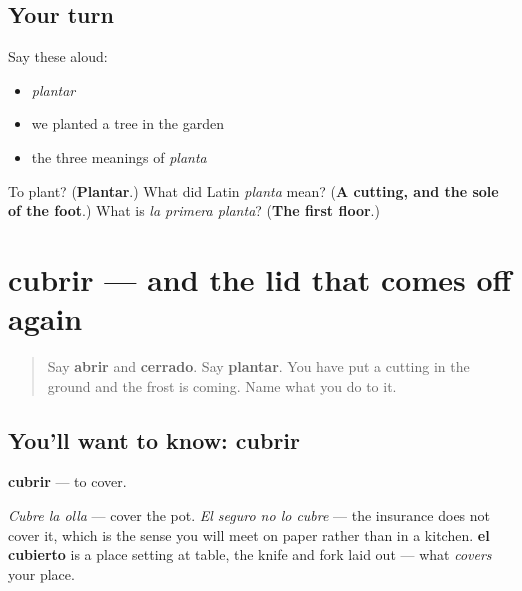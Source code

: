 \subsection*{Your turn}
Say these aloud:

\begin{itemize}
\raggedright
  \item \emph{plantar}
  \item we planted a tree in the garden
  \item the three meanings of \emph{planta}
\end{itemize}

\begin{tcolorbox}[breakable,colback=teal!4,colframe=teal!35!black,title={Before you move on}]
To plant? (\textbf{Plantar}.) What did Latin \emph{planta} mean? (\textbf{A cutting, and the sole of the foot}.) What is \emph{la primera planta}? (\textbf{The first floor}.)
\end{tcolorbox}
\section[cubrir]{cubrir — and the lid that comes off again}

\label{lesson:ES-C444-cubrir}



\begin{quote}
Say \textbf{abrir} and \textbf{cerrado}. Say \textbf{plantar}. You have put a cutting in the ground and the frost is coming. Name what you do to it.
\end{quote}

\subsection*{You'll want to know: cubrir}
\textbf{cubrir} — to cover.

\emph{Cubre la olla} — cover the pot. \emph{El seguro no lo cubre} — the insurance does not cover it, which is the sense you will meet on paper rather than in a kitchen. \textbf{el cubierto} is a place setting at table, the knife and fork laid out — what \emph{covers} your place.

